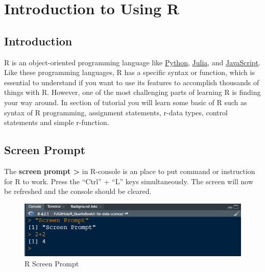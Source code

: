\documentclass[
  letterpaper,
  DIV=11,
  numbers=noendperiod]{scrreprt}
\author{}
\date{}
\begin{document}
\ifdefined\Shaded\renewenvironment{Shaded}{\begin{tcolorbox}[enhanced, sharp corners, breakable, boxrule=0pt, interior hidden, borderline west={3pt}{0pt}{shadecolor}, frame hidden]}{\end{tcolorbox}}\fi

\hypertarget{introduction-to-using-r}{%
\chapter*{Introduction to Using R}\label{introduction-to-using-r}}

\hypertarget{introduction}{%
\section{Introduction}\label{introduction}}

R is an object-oriented programming language like
\href{https://www.python.org/}{Python},
\href{https://julialang.org/}{Julia}, and
\href{https://www.javascript.com/}{JavaScript}. Like these programming
languages, R has a specific syntax or function, which is essential to
understand if you want to use its features to accomplish thousands of
things with R. However, one of the most challenging parts of learning R
is finding your way around. In section of tutorial you will learn some
basic of R such as syntax of R programming, assignment statements,
r-data types, control statements and simple r-function.

\hypertarget{screen-prompt}{%
\section{Screen Prompt}\label{screen-prompt}}

The \textbf{screen prompt \textgreater{}} in R-console is an place to
put command or instruction for R to work. Press the ``Ctrl'' + ``L''
keys simultaneously. The screen will now be refreshed and the console
should be cleared.

\begin{figure}

\caption{\label{fig-screen_prompt}R Screen Prompt}

{\centering \includegraphics{Image/sreen_prompt.png}

}

\end{figure}
\end{document}
